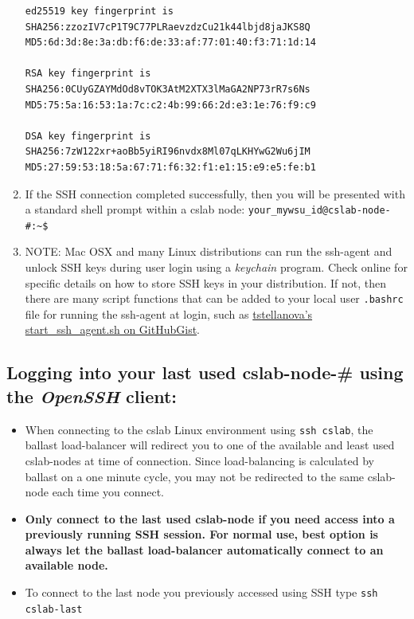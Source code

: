 \documentclass[12pt]{article}
\begin{document}
\begin{flushleft}
\begin{enumerate}
\begin{verbatim}
ed25519 key fingerprint is
SHA256:zzozIV7cP1T9C77PLRaevzdzCu21k44lbjd8jaJKS8Q
MD5:6d:3d:8e:3a:db:f6:de:33:af:77:01:40:f3:71:1d:14

RSA key fingerprint is
SHA256:0CUyGZAYMdOd8vTOK3AtM2XTX3lMaGA2NP73rR7s6Ns
MD5:75:5a:16:53:1a:7c:c2:4b:99:66:2d:e3:1e:76:f9:c9

DSA key fingerprint is
SHA256:7zW122xr+aoBb5yiRI96nvdx8Ml07qLKHYwG2Wu6jIM
MD5:27:59:53:18:5a:67:71:f6:32:f1:e1:15:e9:e5:fe:b1
\end{verbatim}

  \item If the SSH connection completed successfully, then you will be presented with a standard shell prompt within a cslab node:\break
  \verb|your_mywsu_id@cslab-node-#:~$|
  \item NOTE: Mac OSX and many Linux distributions can run the ssh-agent and unlock SSH keys during user login using a \textit{keychain} program. Check online for specific details on how to store SSH keys in your distribution. If not, then there are many script functions that can be added to your local user \texttt{.bashrc} file for running the ssh-agent at login, such as \href{https://gist.github.com/tstellanova/76ee01c1599d9a9433cf}{tstellanova's start\_ssh\_agent.sh on GitHubGist}.
\end{enumerate}

\subsection*{Logging into your last used cslab-node-\# using the \textit{OpenSSH} client:}
\begin{itemize}
  \item When connecting to the cslab Linux environment using \verb|ssh cslab|, the ballast load-balancer will redirect you to one of the available and least used cslab-nodes at time of connection. Since load-balancing is calculated by ballast on a one minute cycle, you may not be redirected to the same cslab-node each time you connect.

  \item \textbf{Only connect to the last used cslab-node if you need access into a previously running SSH session. For normal use, best option is always let the ballast load-balancer automatically connect to an available node.}
  \item To connect to the last node you previously accessed using SSH type \break
  \verb|ssh cslab-last|
\end{itemize}


\end{flushleft}
\end{document}
